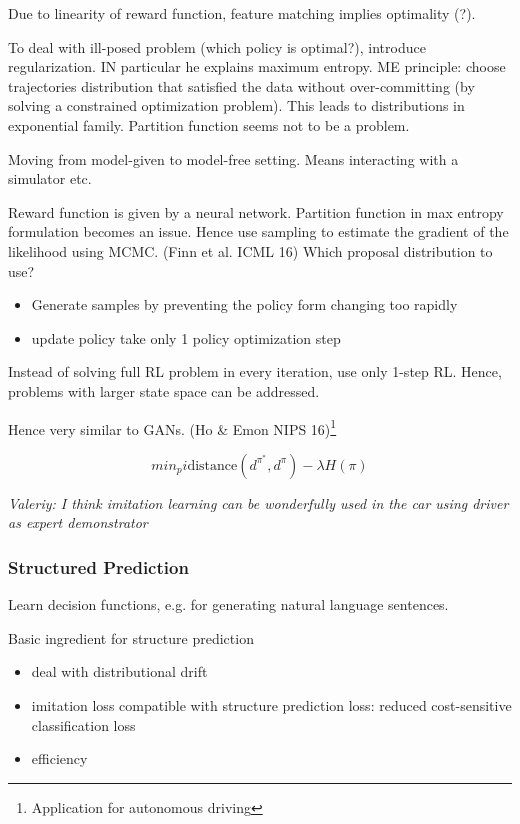 \documentclass[11pt,oneside,a4paper]{scrartcl}
\newcommand{\valeriy}[1]{{\color{blue}\textit{Valeriy: #1}}}
\begin{document}
Due to linearity of reward function, feature matching implies
optimality (?).

To deal with ill-posed problem (which policy is optimal?), introduce regularization. IN
particular he explains maximum entropy. ME principle: choose
trajectories distribution that satisfied the data without
over-committing (by solving a constrained optimization problem). This
leads to distributions in exponential family. Partition function seems
not to be a problem.

Moving from model-given to model-free setting. Means interacting with
a simulator etc.

Reward function is given by a neural network. Partition function in
max entropy formulation becomes an issue. Hence use sampling to
estimate the gradient of the likelihood using MCMC. (Finn et al. ICML
16) Which proposal distribution to use?

\begin{itemize}
\item Generate samples by preventing the policy form changing too
  rapidly

\item update policy take only 1 policy optimization step
\end{itemize}
Instead of solving full RL problem in every iteration, use only 1-step
RL. Hence, problems with larger state space can be addressed.

  Hence very similar to GANs. (Ho \& Emon NIPS
  16)\footnote{Application for autonomous driving}

  $$min_pi \textrm{distance}(d^{\pi^*}, d^{\pi}) - \lambda H(\pi)$$


\valeriy{I think imitation learning can be wonderfully used in the car
  using driver as expert demonstrator}  

  \subsubsection{Structured Prediction}
\label{sec:struct-pred}

Learn decision functions, e.g. for generating natural language
sentences.

Basic ingredient for structure prediction
\begin{itemize}
\item deal with distributional drift
  
\item imitation loss compatible with structure prediction loss: reduced
  cost-sensitive classification loss
  
\item efficiency
  
\end{itemize}
\end{document}
